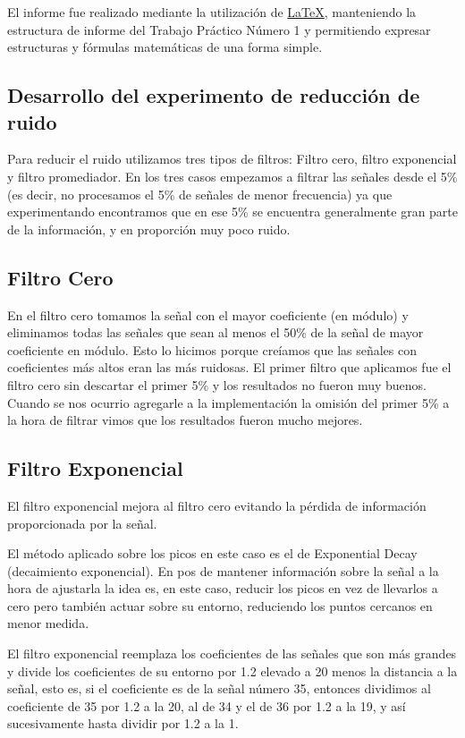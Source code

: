 El informe fue realizado mediante la utilizaci\'on de \href{http://www.latex-project.org/}{LaTeX},
 manteniendo la estructura de informe del Trabajo Pr\'actico N\'umero 1 y
permitiendo expresar estructuras y f\'ormulas matem\'aticas de una forma simple.

\subsection{Desarrollo del experimento de reducci\'on de ruido}

Para reducir el ruido utilizamos tres tipos de filtros: Filtro cero, filtro 
exponencial y filtro promediador. En los tres casos empezamos a filtrar las 
se\~nales desde el 5\% (es decir, no procesamos el 5\% de se\~nales de menor
frecuencia) ya que experimentando encontramos que en ese 5\% se encuentra 
generalmente gran parte de la informaci\'on, y en proporci\'on muy poco ruido.

\subsection{Filtro Cero}

En el filtro cero tomamos la se\~nal con el mayor coeficiente (en m\'odulo) y 
eliminamos todas las se\~nales que sean al menos el 50\% de la se\~nal de mayor 
coeficiente en m\'odulo. Esto lo hicimos porque cre\'iamos que las se\~nales con 
coeficientes m\'as altos eran las m\'as ruidosas. El primer filtro que aplicamos 
fue el filtro cero sin descartar el primer 5\% y los resultados no fueron muy 
buenos. Cuando se nos ocurrio agregarle a la implementaci\'on la omisi\'on del 
primer 5\% a la hora de filtrar vimos que los resultados fueron mucho mejores.

\subsection{Filtro Exponencial}


El filtro exponencial mejora al filtro cero evitando la p\'erdida de
informaci\'on proporcionada por la se\~nal.

El m\'etodo aplicado sobre los picos en este caso es el de Exponential Decay
(decaimiento exponencial). En pos de mantener informaci\'on sobre la se\~nal a
la hora de ajustarla la idea es, en este caso, reducir los picos en vez de
llevarlos a cero pero tambi\'en actuar sobre su entorno, reduciendo los puntos
cercanos en menor medida.

El filtro exponencial reemplaza los coeficientes de las se\~nales que son m\'as 
grandes y divide los coeficientes de su entorno por 1.2 elevado a 20 menos 
la distancia a la se\~nal, esto es, si el coeficiente es de la se\~nal n\'umero 
35, entonces dividimos al coeficiente de 35 por 1.2 a la 20, al de 34 y el de 
36 por 1.2 a la 19, y as\'i sucesivamente hasta dividir por 1.2 a la 1.

